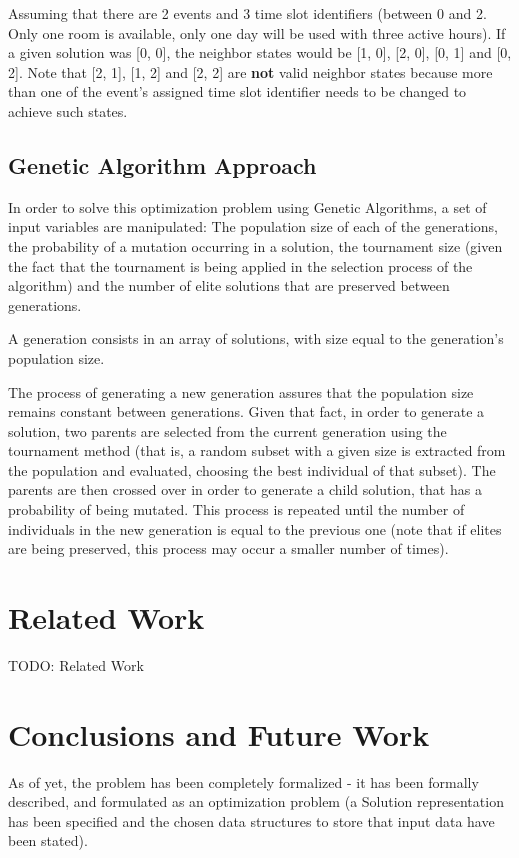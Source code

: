 \documentclass[conference]{IEEEtran}
\begin{document}
Assuming that there are 2 events and 3 time slot identifiers (between 0 and 2. Only one room is available, only one day will be used with three active hours). If a given solution was [0, 0], the neighbor states would be [1, 0], [2, 0], [0, 1] and [0, 2]. Note that [2, 1], [1, 2] and [2, 2] are \textbf{not} valid neighbor states because more than one of the event's assigned time slot identifier needs to be changed to achieve such states.

\subsection{Genetic Algorithm Approach}

In order to solve this optimization problem using Genetic Algorithms, a set of input variables are manipulated: The population size of each of the generations, the probability of a mutation occurring in a solution, the tournament size (given the fact that the tournament is being applied in the selection process of the algorithm) and the number of elite solutions that are preserved between generations.

A generation consists in an array of solutions, with size equal to the generation's population size.

The process of generating a new generation assures that the population size remains constant between generations. Given that fact, in order to generate a solution, two parents are selected from the current generation using the tournament method (that is, a random subset with a given size is extracted from the population and evaluated, choosing the best individual of that subset). The parents are then crossed over in order to generate a child solution, that has a probability of being mutated. This process is repeated until the number of individuals in the new generation is equal to the previous one (note that if elites are being preserved, this process may occur a smaller number of times).


\section{Related Work}

TODO: Related Work

\section{Conclusions and Future Work}

As of yet, the problem has been completely formalized - it has been formally described, and formulated as an optimization problem (a Solution representation has been specified and the chosen data structures to store that input data have been stated).
\end{document}
